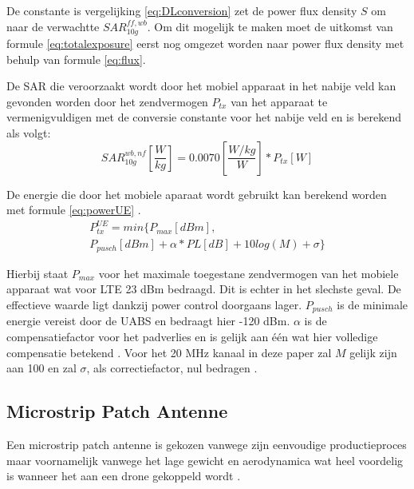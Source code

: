 \documentclass[twocolumn]{phdsymp_dutch}
\begin{document}
De constante is vergelijking \ref{eq:DLconversion} zet de \gls{power flux density} $S$ om  naar de verwachtte $SAR^{ff,wb}_{10g}$.
Om dit mogelijk te maken moet 
de uitkomst van formule \ref{eq:totalexposure} eerst nog omgezet worden naar \gls{power flux density} met behulp van formule
\ref{eq:flux}.

De \gls{SAR} die veroorzaakt wordt door het mobiel apparaat in het nabije veld kan gevonden worden door 
het zendvermogen $P_{tx}$ van het  apparaat te vermenigvuldigen met de conversie constante voor het nabije veld
en is berekend als volgt:
\begin{equation} 
SAR^{wb,nf}_{10g} \left[\frac{W}{kg}\right] = 0.0070 \left[\frac{W/kg}{W}\right] * P_{tx} [W]
\label{eq:ulToSar}
\end{equation}

De energie die door het mobiele aparaat wordt gebruikt kan berekend worden met formule \ref{eq:powerUE} \cite{J22_plets2015joint}.
\begin{multline} 
P_{tx}^{UE} = min \big\{P_{max} [dBm] , \\
 P_{pusch} [dBm] + \alpha * PL [dB] + 10log(M) + \sigma \big\}
\label{eq:powerUE}
\end{multline}


Hierbij staat $P_{max}$ voor het maximale toegestane zendvermogen van het mobiele apparaat wat voor LTE 23 dBm bedraagd.
Dit is echter in het slechste geval. De effectieve waarde ligt dankzij power control doorgaans lager.
$P_{pusch}$ is de minimale energie vereist door de 
\gls{UABS} en bedraagt hier -120 dBm. 
$\alpha$ is de compensatiefactor voor het padverlies en is gelijk aan \'e\'en wat hier volledige compensatie betekend \cite{J32,J33}.
Voor het 20 MHz kanaal in deze paper zal $M$ gelijk zijn aan 100 en
 zal $\sigma$,  als correctiefactor, nul bedragen \cite{J22_plets2015joint,J32}.

\subsection{Microstrip Patch Antenne}
Een microstrip patch antenne is gekozen vanwege zijn eenvoudige productieproces maar voornamelijk vanwege het
 lage gewicht en aerodynamica wat heel voordelig is wanneer het aan een drone gekoppeld wordt \cite{J13_microstripadvantages}.
\end{document}
